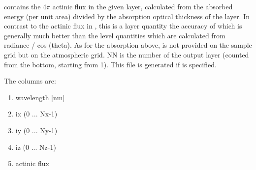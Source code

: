 \begin{description}
{ \item[mc.act.spc]
   contains the 4$\pi$ actinic flux in the given layer,
  calculated from the absorbed energy (per unit area) divided by the 
  absorption optical thickness of the layer. In contrast to the 
  actinic flux in , this is a layer quantity the 
  accuracy of which is generally much better than the level quantities 
  which are calculated from radiance / cos (theta). As for the absorption
  above,  is not provided on the sample grid but on the
  atmospheric grid. NN is the number of the output layer (counted from the
  bottom, starting from 1). This file is generated if  is specified. 
    
  The columns are:
  \begin{enumerate}
  \item  wavelength [nm]
  \item  ix (0 ... Nx-1)
  \item  iy (0 ... Ny-1)
  \item  iz (0 ... Nz-1)
  \item  actinic flux
  \end{enumerate}
}
\end{description}

